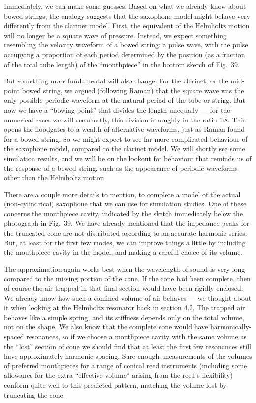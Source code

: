   Immediately, we can make some guesses. Based on what we already know about 
  bowed strings, the analogy suggests that the saxophone model might behave 
  very differently from the clarinet model. First, the equivalent of the 
  Helmholtz motion will no longer be a square wave of pressure. Instead, we 
  expect something resembling the velocity waveform of a bowed string: a pulse 
  wave, with the pulse occupying a proportion of each period determined by the 
  position (as a fraction of the total tube length) of the “mouthpiece” in the 
  bottom sketch of Fig.\ 39. 

  But something more fundamental will also change. For the clarinet, or the 
  mid-point bowed string, we argued (following Raman) that the square wave was 
  the only possible periodic waveform at the natural period of the tube or 
  string. But now we have a “bowing point” that divides the length unequally — 
  for the numerical cases we will see shortly, this division is roughly in the 
  ratio 1:8. This opens the floodgates to a wealth of alternative waveforms, 
  just as Raman found for a bowed string. So we might expect to see far more 
  complicated behaviour of the saxophone model, compared to the clarinet model. 
  We will shortly see some simulation results, and we will be on the lookout 
  for behaviour that reminds us of the response of a bowed string, such as the 
  appearance of periodic waveforms other than the Helmholtz motion. 

  There are a couple more details to mention, to complete a model of the actual 
  (non-cylindrical) saxophone that we can use for simulation studies. One of 
  these concerns the mouthpiece cavity, indicated by the sketch immediately 
  below the photograph in Fig.\ 39. We have already mentioned that the 
  impedance peaks for the truncated cone are not distributed according to an 
  accurate harmonic series. But, at least for the first few modes, we can 
  improve things a little by including the mouthpiece cavity in the model, and 
  making a careful choice of its volume. 

  The approximation again works best when the wavelength of sound is very long 
  compared to the missing portion of the cone. If the cone had been complete, 
  then of course the air trapped in that final section would have been rigidly 
  enclosed. We already know how such a confined volume of air behaves — we 
  thought about it when looking at the Helmholtz resonator back in section 4.2. 
  The trapped air behaves like a simple spring, and its stiffness depends only 
  on the total volume, not on the shape. We also know that the complete cone 
  would have harmonically-spaced resonances, so if we choose a mouthpiece 
  cavity with the same volume as the “lost” section of cone we should find that 
  at least the first few resonances still have approximately harmonic spacing. 
  Sure enough, measurements of the volumes of preferred mouthpieces for a range 
  of conical reed instruments (including some allowance for the extra 
  ``effective volume'' arising from the reed's flexibility) conform quite well 
  to this predicted pattern, matching the volume lost by truncating the cone. 

